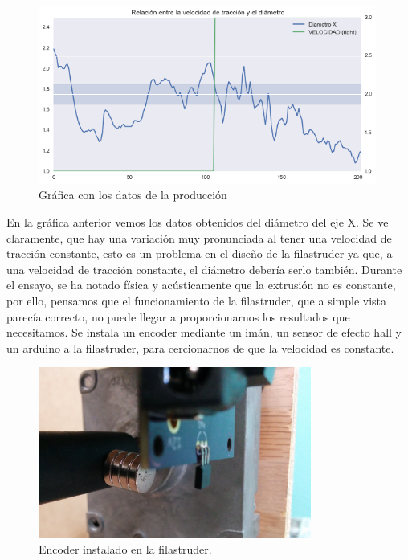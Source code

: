 \begin{figure}[H]
    \centering
    \includegraphics[width=0.99\textwidth]{images/producciones/20072015/graficas.png}
    \caption{Gráfica con los datos de la producción}
    \label{fig:2007105-graf}
\end{figure}

En la gráfica anterior vemos los datos obtenidos del diámetro del eje X. Se ve claramente, que hay una variación muy pronunciada al tener una velocidad de tracción constante, esto es un problema en el diseño de la filastruder ya que, a una velocidad de tracción constante, el diámetro debería serlo también. Durante el ensayo, se ha notado física y acústicamente que la extrusión no es constante, por ello, pensamos que el funcionamiento de la filastruder, que a simple vista parecía correcto, no puede llegar a proporcionarnos los resultados que necesitamos. Se instala un encoder mediante un imán, un sensor de efecto hall y un arduino a la filastruder, para cercionarnos de que la velocidad es constante.

\begin{figure}[H]
    \centering
    \includegraphics[width=0.8\textwidth]{images/producciones/20072015/IMG_20150721_110502.jpg}
    \caption{Encoder instalado en la filastruder.}
    \label{fig:2007105-enc}
\end{figure}

